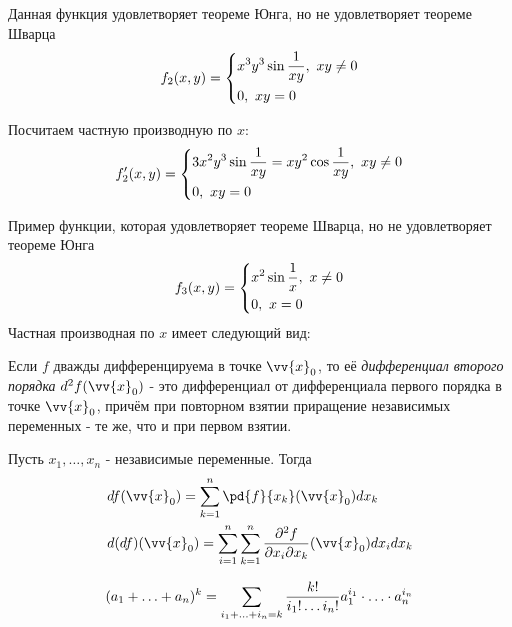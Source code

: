 \begin{example}
	Данная функция удовлетворяет теореме Юнга, но не удовлетворяет теореме Шварца
	\[
		f_2(x, y) = \left\{\begin{aligned}
			&{x^3 y^3 \sin \frac{1}{xy},\ xy \neq 0}
			\\
			&{0,\ xy = 0}
		\end{aligned}\right.
	\]
	
	Посчитаем частную производную по $x$:
	\[
		f_2'(x, y) = \System{
			&{3x^2y^3 \sin \frac{1}{xy} = xy^2 \cos \frac{1}{xy},\ xy \neq 0}
			\\
			&{0,\ xy = 0}
		}
	\]
\end{example}

\begin{example}
	Пример функции, которая удовлетворяет теореме Шварца, но не удовлетворяет теореме Юнга
	\[
		f_3(x, y) = \left\{\begin{aligned}
			&{x^2 \sin \frac{1}{x},\ x \neq 0}
			\\
			&{0,\ x = 0}
		\end{aligned}\right.
	\]
	Частная производная по $x$ имеет следующий вид:
\end{example}

\begin{definition}
	Если $f$ дважды дифференцируема в точке $\vv{x}_0$, то её \textit{дифференциал второго порядка} $d^2 f(\vv{x}_0)$ - это дифференциал от дифференциала первого порядка в точке $\vv{x}_0$, причём при повторном взятии приращение независимых переменных - те же, что и при первом взятии.
\end{definition}

\begin{note}
	Пусть $x_1, \ldots, x_n$ - независимые переменные. Тогда
	\begin{align*}
		&{df(\vv{x}_0) = \suml_{k = 1}^n \pd{f}{x_k} (\vv{x}_0) dx_k}
		\\
		&{d(df)(\vv{x}_0) = \suml_{i = 1}^n \suml_{k = 1}^n \frac{\vdelta^2 f}{\vdelta x_i \vdelta x_k} (\vv{x}_0) dx_i dx_k}
	\end{align*}
\end{note}

\begin{lemma}
	\[
		(a_1 + \ldots + a_n)^k = \sum\limits_{i_1 + \ldots + i_n = k} \frac{k!}{i_1! \ldots i_n!} a_1^{i_1} \cdot \ldots \cdot a_n^{i_n}
	\]
\end{lemma}

